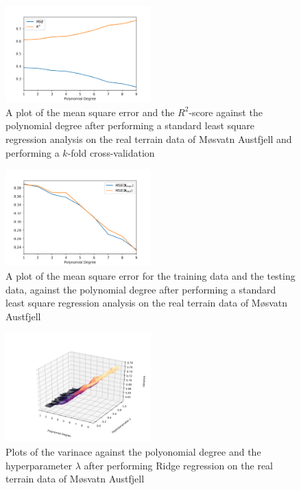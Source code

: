\documentclass[a4paper,10pt,english]{article}
\begin{document}
\begin{figure}[H]
	\centering 
	\includegraphics[width = 0.5\textwidth, center]{../real_output/part_B.png}
	\caption{
		A plot of the mean square error and the $R^2$-score against the polynomial degree after performing a standard least square regression analysis on the real terrain data of Møsvatn Austfjell and performing a $k$-fold cross-validation
	}
	\label{part_g_b}
\end{figure}


\begin{figure}[H]
	\centering 
	\includegraphics[width = 0.5\textwidth, center]{../real_output/part_C_2.png}
	\caption{
		A plot of the mean square error for the training data and the testing data, against the polynomial degree after performing a standard least square regression analysis on the real terrain data of Møsvatn Austfjell
	}
	\label{part_g_c2}
\end{figure}



\begin{figure}[H]
	\centering 
	\includegraphics[width = 0.5\textwidth, center]{../real_output/part_D_1.png}
	\caption{
		Plots of the varinace against the polyonomial degree and the hyperparameter $\lambda$ after performing Ridge regression on the real terrain data of Møsvatn Austfjell
	}
	\label{part_g_d1}
\end{figure}
\end{document}
